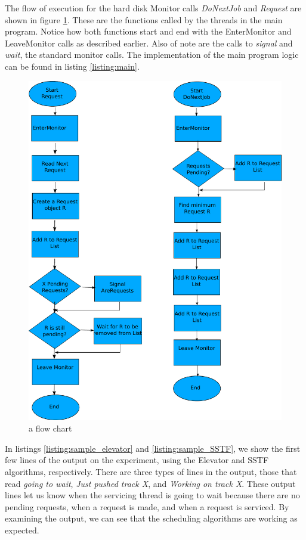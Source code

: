 \documentclass{report}
\begin{document}
The flow of execution for the hard disk Monitor calls \emph{DoNextJob} and \emph{Request}
are shown in figure \ref{fig:flow}. These are the functions called by the threads in the
main program. Notice how both functions start and end with the EnterMonitor and
LeaveMonitor calls as described earlier. Also of note are the calls to \emph{signal} and
\emph{wait}, the standard monitor calls. The implementation of the main program logic can
be found in listing \ref{listing:main}.
\begin{figure}[htb!]
    \centering
    \includegraphics[scale=0.8]{300_flow.pdf}
    \caption{a flow chart}
    \label{fig:flow}
\end{figure}

In listings \ref{listing:sample_elevator} and \ref{listing:sample_SSTF}, we show the
first few lines of the output on the experiment, using the Elevator and SSTF algorithms,
respectively. There are three types of lines in the output, those that read \emph{going to
wait}, \emph{Just pushed track X}, and \emph{Working on track X}. These output lines let
us know when the servicing thread is going to wait because there are no pending requests,
when a request is made, and when a request is serviced. By examining the output, we can
see that the scheduling algorithms are working as expected. 
\end{document}

